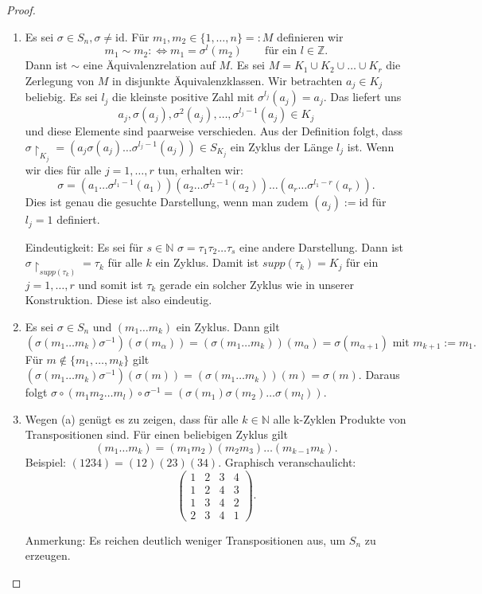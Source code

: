 \documentclass[12pt]{scrartcl}%
\theoremstyle{definition}
\theoremstyle{remark}
\newcommand{\Inv}[1]{#1^{-1}}
\begin{document}
\begin{proof}
\begin{enumerate}[label=(\alph*)] %
    \item Es sei $\sigma\in S_n, \sigma\neq\text{id}$. Für $m_1,m_2\in\{1,\dots,n\}=:M$ definieren wir 
    \[m_1\sim m_2 :\Leftrightarrow m_1 = \sigma^l(m_2)\qquad\text{für ein }l\in\mathbb{Z}.\]
    Dann ist $\sim$ eine Äquivalenzrelation auf $M$. Es sei $M = K_1\cup K_2\cup\dots\cup K_r$ die Zerlegung von $M$ in disjunkte Äquivalenzklassen. Wir betrachten $a_j\in K_j$ beliebig. Es sei $l_j$ die kleinste positive Zahl mit $\sigma^{l_j}(a_j) = a_j$. Das liefert uns
    \[a_j,\sigma(a_j),\sigma^2(a_j),\dots,\sigma^{l_j-1}(a_j)\in K_j\]
    und diese Elemente sind paarweise verschieden. Aus der Definition folgt, dass $\sigma\upharpoonright_{K_j}=(a_j\sigma(a_j)\dots\sigma^{l_j-1}(a_j))\in S_{K_j}$ ein Zyklus der Länge $l_j$ ist. Wenn wir dies für alle $j=1,\dots,r$ tun, erhalten wir:
    \[\sigma = (a_1\dots\sigma^{l_1-1}(a_1))(a_2\dots\sigma^{l_2-1}(a_2))\dots(a_r\dots\sigma^{l_1-r}(a_r)).\]
    Dies ist genau die gesuchte Darstellung, wenn man zudem $(a_j):=\text{id}$ für $l_j = 1$ definiert.

    Eindeutigkeit: Es sei für $s\in\mathbb{N}$ $\sigma = \tau_1\tau_2\dots\tau_s$ eine andere Darstellung. Dann ist $\sigma\upharpoonright_{supp(\tau_k)} = \tau_k$ für alle $k$ ein Zyklus. Damit ist $supp(\tau_k) = K_j$ für ein $j=1,\dots,r$ und somit ist $\tau_k$ gerade ein solcher Zyklus wie in unserer Konstruktion. Diese ist also eindeutig.

    \item Es sei $\sigma\in S_n$ und $(m_1\dots m_k)$ ein Zyklus. Dann gilt
    \[(\sigma(m_1\dots m_k)\Inv\sigma)(\sigma(m_{\alpha}))=(\sigma(m_1\dots m_k))(m_{\alpha}) = \sigma(m_{\alpha+1})\text{ mit }m_{k+1}:=m_1.\] 
    Für $m\notin \{m_1,\dots,m_k\}$ gilt $(\sigma(m_1\dots m_k)\sigma^{-1})(\sigma(m))=(\sigma(m_1\dots m_k))(m) = \sigma(m)$. Daraus folgt $\sigma\circ(m_1m_2\dots m_l)\circ\sigma^{-1} = (\sigma(m_1)\sigma(m_2)\dots\sigma(m_l))$.

    \item Wegen (a) genügt es zu zeigen, dass für alle $k\in\mathbb{N}$ alle k-Zyklen Produkte von Transpositionen sind. Für einen beliebigen Zyklus gilt
    \[(m_1\dots m_k) = (m_1m_2)(m_2m_3)\dots (m_{k-1}m_k).\]
    Beispiel: $(1234) = (12)(23)(34)$. Graphisch veranschaulicht:
    \[\begin{pmatrix}
        1 & 2 & 3 & 4 \\ %
        1 & 2 & 4 & 3 \\ %
        1 & 3 & 4 & 2 \\ %
        2 & 3 & 4 & 1
    \end{pmatrix}.\]
    
    Anmerkung: Es reichen deutlich weniger Transpositionen aus, um $S_n$ zu erzeugen.
\end{enumerate}

\end{proof}
\end{document}

